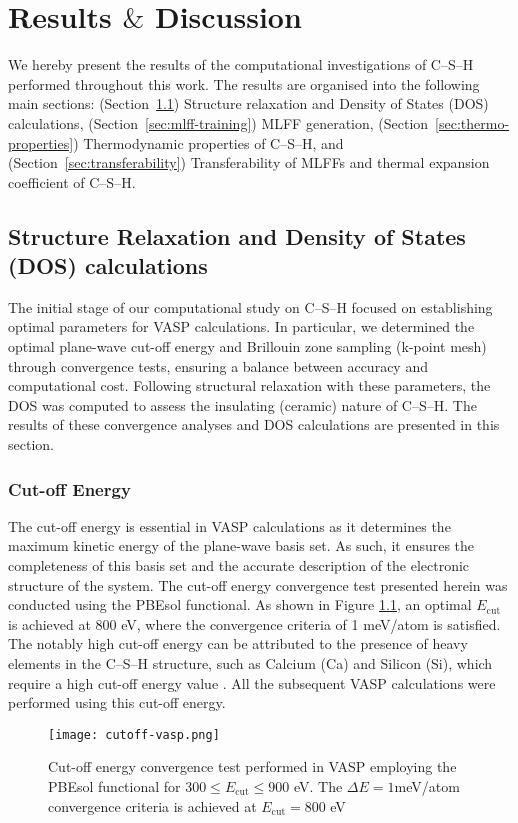 \chapter{\texorpdfstring{Results $\&$ Discussion}{Results \& Discussion}}
\label{Chapter4}
We hereby present the results of the computational investigations of C--S--H performed throughout this work. The results are organised into the following main sections: (Section~\ref{sec:bulk-params-dos}) Structure relaxation and Density of States (DOS) calculations, (Section~\ref{sec:mlff-training}) MLFF generation, (Section~\ref{sec:thermo-properties}) Thermodynamic properties of  C--S--H, and (Section~\ref{sec:transferability}) Transferability of MLFFs and thermal expansion coefficient of C--S--H.
 
\section{Structure Relaxation and Density of States (DOS) calculations}
\label{sec:bulk-params-dos}
The initial stage of our computational study on C--S--H focused on establishing optimal parameters for VASP calculations. In particular, we determined the optimal plane-wave cut-off energy and Brillouin zone sampling (k-point mesh) through convergence tests, ensuring a balance between accuracy and computational cost. Following structural relaxation with these parameters, the DOS was computed to assess the insulating (ceramic) nature of C--S--H. The results of these convergence analyses and DOS calculations are presented in this section.
\subsection{Cut-off Energy}
The cut-off energy is essential in VASP calculations as it determines the maximum kinetic energy of the plane-wave basis set. As such, it ensures the completeness of this basis set and the accurate description of the electronic structure of the system.  The cut-off energy convergence test presented herein was conducted using the PBEsol functional. As shown in Figure \ref{cutoff-energy}, an optimal $E_{\text{cut}}$ is achieved at 800 eV, where the convergence criteria of 1 meV/atom is satisfied. The notably high cut-off energy can be attributed to the presence of heavy elements in the C--S--H structure, such as Calcium (Ca) and Silicon (Si), which require a high cut-off energy value \cite{zotero-item-698}. All the subsequent VASP calculations were performed using this cut-off energy.
\begin{figure}[H]
    \centering
    \texttt{[image: cutoff-vasp.png]}
    \caption{
    Cut-off energy convergence test performed in VASP employing the PBEsol functional for $300 \leq E_{\text{cut}} \leq 900$ eV. The $\Delta E = 1$meV/atom convergence criteria is achieved at $E_{\text {cut}} = 800$ eV}
    \label{cutoff-energy}
\end{figure}

